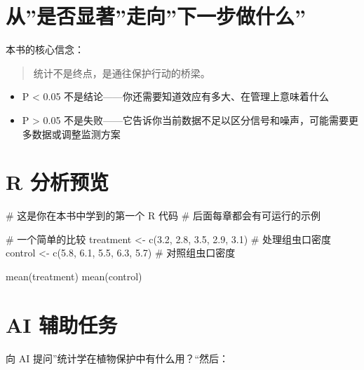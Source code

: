 \documentclass[
  letterpaper,
]{scrbook}
\newenvironment{Shaded}{\begin{snugshade}}{\end{snugshade}}
\newcommand{\CommentTok}[1]{\textcolor[rgb]{0.37,0.37,0.37}{#1}}
\newcommand{\FloatTok}[1]{\textcolor[rgb]{0.68,0.00,0.00}{#1}}
\newcommand{\FunctionTok}[1]{\textcolor[rgb]{0.28,0.35,0.67}{#1}}
\newcommand{\NormalTok}[1]{\textcolor[rgb]{0.00,0.23,0.31}{#1}}
\newcommand{\OtherTok}[1]{\textcolor[rgb]{0.00,0.23,0.31}{#1}}
\providecommand{\tightlist}{%
  \setlength{\itemsep}{0pt}\setlength{\parskip}{0pt}}
\begin{document}
\section{从''是否显著''走向''下一步做什么''}\label{ux4eceux662fux5426ux663eux8457ux8d70ux5411ux4e0bux4e00ux6b65ux505aux4ec0ux4e48}

本书的核心信念：

\begin{quote}
统计不是终点，是通往保护行动的桥梁。
\end{quote}

\begin{itemize}
\tightlist
\item
  P \textless{} 0.05
  不是结论------你还需要知道效应有多大、在管理上意味着什么
\item
  P \textgreater{} 0.05
  不是失败------它告诉你当前数据不足以区分信号和噪声，可能需要更多数据或调整监测方案
\end{itemize}

\section{R 分析预览}\label{r-ux5206ux6790ux9884ux89c8}

\begin{Shaded}
\begin{Highlighting}[]
\CommentTok{\# 这是你在本书中学到的第一个 R 代码}
\CommentTok{\# 后面每章都会有可运行的示例}

\CommentTok{\# 一个简单的比较}
\NormalTok{treatment }\OtherTok{\textless{}{-}} \FunctionTok{c}\NormalTok{(}\FloatTok{3.2}\NormalTok{, }\FloatTok{2.8}\NormalTok{, }\FloatTok{3.5}\NormalTok{, }\FloatTok{2.9}\NormalTok{, }\FloatTok{3.1}\NormalTok{)  }\CommentTok{\# 处理组虫口密度}
\NormalTok{control  }\OtherTok{\textless{}{-}} \FunctionTok{c}\NormalTok{(}\FloatTok{5.8}\NormalTok{, }\FloatTok{6.1}\NormalTok{, }\FloatTok{5.5}\NormalTok{, }\FloatTok{6.3}\NormalTok{, }\FloatTok{5.7}\NormalTok{)  }\CommentTok{\# 对照组虫口密度}

\FunctionTok{mean}\NormalTok{(treatment)}
\FunctionTok{mean}\NormalTok{(control)}
\end{Highlighting}
\end{Shaded}

\section{AI 辅助任务}\label{ai-ux8f85ux52a9ux4efbux52a1}

向 AI 提问''统计学在植物保护中有什么用？``然后：
\end{document}
